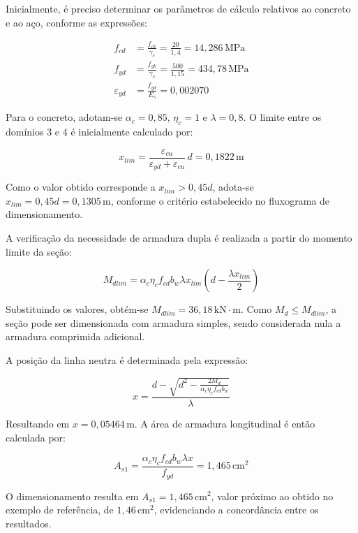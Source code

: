 Inicialmente, é preciso determinar os parâmetros de cálculo relativos ao concreto e ao aço, conforme as expressões:

\begin{align}
f_{cd} &= \frac{f_{ck}}{\gamma_c}
= \frac{20}{1,4}
= 14,286\,\text{MPa} \\
f_{yd} &= \frac{f_{yk}}{\gamma_s}
= \frac{500}{1,15}
= 434,78\,\text{MPa} \\
\varepsilon_{yd} &= \frac{f_{yd}}{E_s}
= 0,002070
\end{align}

Para o concreto, adotam-se $\alpha_c=0,85$, $\eta_c=1$ e $\lambda=0,8$. O limite entre os domínios 3 e 4 é inicialmente calculado por:

\begin{equation}
x_{lim}=
\frac{\varepsilon_{cu}}
{\varepsilon_{yd}+\varepsilon_{cu}}\,d
=0,1822\,\text{m}
\end{equation}

Como o valor obtido corresponde a $x_{lim}>0,45d$, adota-se $x_{lim}=0,45d=0,1305\,\text{m}$, conforme o critério estabelecido no fluxograma de dimensionamento.

A verificação da necessidade de armadura dupla é realizada a partir do momento limite da seção:

\begin{equation}
M_{dlim}=
\alpha_c\eta_c f_{cd}b_w\lambda x_{lim}
\left(d-\frac{\lambda x_{lim}}{2}\right)
\end{equation}

Substituindo os valores, obtém-se $M_{dlim}=36,18\,\text{kN}\cdot\text{m}$. Como $M_d\leq M_{dlim}$, a seção pode ser dimensionada com armadura simples, sendo considerada nula a armadura comprimida adicional.

A posição da linha neutra é determinada pela expressão:

\begin{equation}
x=
\frac{d-\sqrt{d^2-
\frac{2M_d}{\alpha_c\eta_c f_{cd}b_w}}}{\lambda}
\end{equation}

Resultando em $x=0,05464\,\text{m}$. A área de armadura longitudinal é então calculada por:

\begin{equation}
A_{s1}=
\frac{\alpha_c\eta_c f_{cd}b_w\lambda x}{f_{yd}}
=1,465\,\text{cm}^2
\end{equation}

O dimensionamento resulta em $A_{s1}=1,465\,\text{cm}^2$, valor próximo ao obtido no exemplo de referência, de $1,46\,\text{cm}^2$, evidenciando a concordância entre os resultados.

